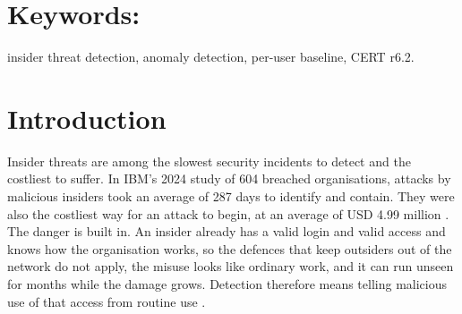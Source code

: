 \documentclass[a4paper,12pt]{article}
\begin{document}
\section*{Keywords:}
insider threat detection, anomaly detection, per-user baseline, CERT r6.2.

\newpage

\let\oldsection\section
\renewcommand{\section}{\clearpage\oldsection}
\let\oldsubsection\subsection
\renewcommand{\subsection}{\Needspace{12\baselineskip}\oldsubsection}
\let\oldparagraph\paragraph
\renewcommand{\paragraph}{\Needspace{4\baselineskip}\oldparagraph}

\section{Introduction}

Insider threats are among the slowest security incidents to detect and the costliest to suffer. In IBM's 2024 study of 604 breached organisations, attacks by malicious insiders took an average of 287 days to identify and contain. They were also the costliest way for an attack to begin, at an average of USD 4.99 million \cite{IBM2024}. The danger is built in. An insider already has a valid login and valid access and knows how the organisation works, so the defences that keep outsiders out of the network do not apply, the misuse looks like ordinary work, and it can run unseen for months while the damage grows. Detection therefore means telling malicious use of that access from routine use \cite{Cappelli2012,Homoliak2019}.
\end{document}
